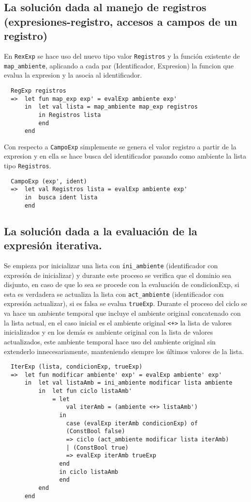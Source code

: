 \documentclass[12pt, times]{simauth}
\begin{document}
\subsection{La solución dada al manejo de registros (expresiones-registro, accesos a campos de un registro)}

En \texttt{RexExp} se hace uso del nuevo tipo valor \texttt{Registros} y la función existente de \texttt{map\_ambiente}, aplicando a cada par (Identificador, Expresion) la funcion que evalua la expresion y la asocia al identificador.

\begin{verbatim}
  RegExp registros
  =>  let fun map_exp exp' = evalExp ambiente exp'
      in  let val lista = map_ambiente map_exp registros
          in Registros lista
          end
      end
\end{verbatim}

Con respecto a \texttt{CampoExp} simplemente se genera el valor registro a partir de la expresion y en ella se hace busca del identificador pasando como ambiente la lista tipo \texttt{Registros}.

\begin{verbatim}
  CampoExp (exp', ident)
  =>  let val Registros lista = evalExp ambiente exp'
      in  busca ident lista
      end
\end{verbatim}

\subsection{La solución dada a la evaluación de la expresión iterativa.}

Se empieza por inicializar una lista con \texttt{ini\_ambiente} (identificador con expresión de inicializar) y durante este proceso se verifica que el dominio sea disjunto, en caso de que lo sea se procede con la evaluación de condicionExp, si esta es verdadera se actualiza la lista con \texttt{act\_ambiente} (identificador con expresión actualizar), si es falsa se evalua \texttt{trueExp}. Durante el proceso del ciclo se va hace un ambiente temporal que incluye el ambiente original concatenado con la lista actual, en el caso inicial es el ambiente original \texttt{<+>} la lista de valores inicializados y en los demás es ambiente original con la lista de valores actualizados, este ambiente temporal hace uso del ambiente original sin extenderlo innecesariamente, manteniendo siempre los últimos valores de la lista. 

\begin{verbatim}
  IterExp (lista, condicionExp, trueExp)
  =>  let fun modificar ambiente' exp' = evalExp ambiente' exp'
      in  let val listaAmb = ini_ambiente modificar lista ambiente
          in  let fun ciclo listaAmb' 
              = let 
                  val iterAmb = (ambiente <+> listaAmb')
                in
                  case (evalExp iterAmb condicionExp) of
                  (ConstBool false) 
                  => ciclo (act_ambiente modificar lista iterAmb)
                  | (ConstBool true)  
                  => evalExp iterAmb trueExp
                end
                in ciclo listaAmb
                end
          end
      end
\end{verbatim}
\end{document}
